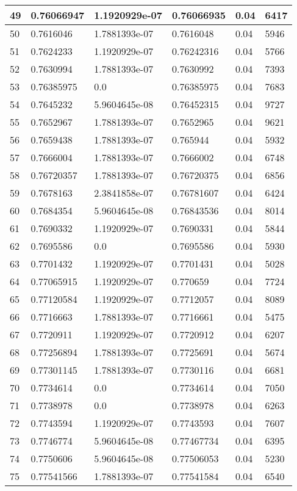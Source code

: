 \begin{longtable}{|l|l|l|l|l|l|}
49 & 0.76066947 & 1.1920929e-07 & 0.76066935 & 0.04 & 6417 \\ \hline 
50 & 0.7616046 & 1.7881393e-07 & 0.7616048 & 0.04 & 5946 \\ \hline 
51 & 0.7624233 & 1.1920929e-07 & 0.76242316 & 0.04 & 5766 \\ \hline 
52 & 0.7630994 & 1.7881393e-07 & 0.7630992 & 0.04 & 7393 \\ \hline 
53 & 0.76385975 & 0.0 & 0.76385975 & 0.04 & 7683 \\ \hline 
54 & 0.7645232 & 5.9604645e-08 & 0.76452315 & 0.04 & 9727 \\ \hline 
55 & 0.7652967 & 1.7881393e-07 & 0.7652965 & 0.04 & 9621 \\ \hline 
56 & 0.7659438 & 1.7881393e-07 & 0.765944 & 0.04 & 5932 \\ \hline 
57 & 0.7666004 & 1.7881393e-07 & 0.7666002 & 0.04 & 6748 \\ \hline 
58 & 0.76720357 & 1.7881393e-07 & 0.76720375 & 0.04 & 6856 \\ \hline 
59 & 0.7678163 & 2.3841858e-07 & 0.76781607 & 0.04 & 6424 \\ \hline 
60 & 0.7684354 & 5.9604645e-08 & 0.76843536 & 0.04 & 8014 \\ \hline 
61 & 0.7690332 & 1.1920929e-07 & 0.7690331 & 0.04 & 5844 \\ \hline 
62 & 0.7695586 & 0.0 & 0.7695586 & 0.04 & 5930 \\ \hline 
63 & 0.7701432 & 1.1920929e-07 & 0.7701431 & 0.04 & 5028 \\ \hline 
64 & 0.77065915 & 1.1920929e-07 & 0.770659 & 0.04 & 7724 \\ \hline 
65 & 0.77120584 & 1.1920929e-07 & 0.7712057 & 0.04 & 8089 \\ \hline 
66 & 0.7716663 & 1.7881393e-07 & 0.7716661 & 0.04 & 5475 \\ \hline 
67 & 0.7720911 & 1.1920929e-07 & 0.7720912 & 0.04 & 6207 \\ \hline 
68 & 0.77256894 & 1.7881393e-07 & 0.7725691 & 0.04 & 5674 \\ \hline 
69 & 0.77301145 & 1.7881393e-07 & 0.7730116 & 0.04 & 6681 \\ \hline 
70 & 0.7734614 & 0.0 & 0.7734614 & 0.04 & 7050 \\ \hline 
71 & 0.7738978 & 0.0 & 0.7738978 & 0.04 & 6263 \\ \hline 
72 & 0.7743594 & 1.1920929e-07 & 0.7743593 & 0.04 & 7607 \\ \hline 
73 & 0.7746774 & 5.9604645e-08 & 0.77467734 & 0.04 & 6395 \\ \hline 
74 & 0.7750606 & 5.9604645e-08 & 0.77506053 & 0.04 & 5230 \\ \hline 
75 & 0.77541566 & 1.7881393e-07 & 0.77541584 & 0.04 & 6540 \\ \hline 
\end{longtable}